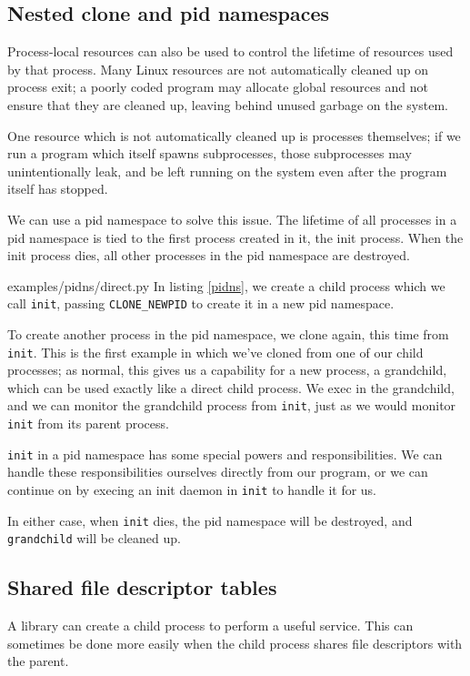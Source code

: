 \documentclass[sigplan]{acmart}
\begin{document}
\subsection{Nested clone and pid namespaces}
Process-local resources can also be used to control the lifetime of resources used by that process.
Many Linux resources are not automatically cleaned up on process exit;
a poorly coded program may allocate global resources
and not ensure that they are cleaned up,
leaving behind unused garbage on the system.

One resource which is not automatically cleaned up is processes themselves;
if we run a program which itself spawns subprocesses,
those subprocesses may unintentionally leak,
and be left running on the system even after the program itself has stopped.

We can use a pid namespace to solve this issue.
The lifetime of all processes in a pid namespace is tied to the first process created in it,
the init process.
When the init process dies,
all other processes in the pid namespace are destroyed.


{examples/pidns/direct.py}
In listing \ref{pidns},
we create a child process which we call \texttt{init},
passing \verb|CLONE_NEWPID| to create it in a new pid namespace.

To create another process in the pid namespace,
we clone again, this time from \texttt{init}.
This is the first example in which we've cloned from one of our child processes;
as normal, this gives us a capability for a new process, a grandchild,
which can be used exactly like a direct child process.
We exec in the grandchild,
and we can monitor the grandchild process from \texttt{init},
just as we would monitor \texttt{init} from its parent process.

\texttt{init} in a pid namespace has some special powers and responsibilities.
We can handle these responsibilities ourselves directly from our program,
or we can continue on by execing an init daemon in \texttt{init} to handle it for us.

In either case, when \texttt{init} dies,
the pid namespace will be destroyed,
and \texttt{grandchild} will be cleaned up.
\subsection{Shared file descriptor tables}\label{shared_fd_table}
A library can create a child process to perform a useful service.
This can sometimes be done more easily when the child process shares file descriptors with the parent.
\end{document}
